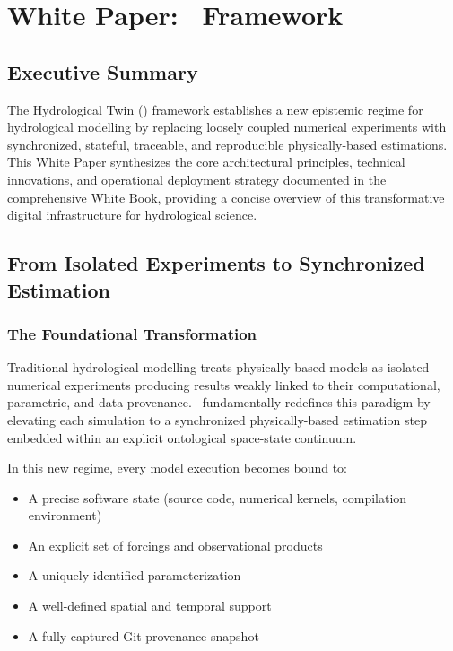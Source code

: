 \chapter*{White Paper: \hydrot\ Framework}
{}
\fancyhead[LE]{\thepage} 
\fancyhead[RO]{\thepage} 
\fancyfoot[C]{\thepage}

\renewcommand{\headrulewidth}{0.1pt}

\setlength{\parindent}{0cm}
\setlength{\parskip}{9pt}
\vspace{-1cm}

\htastarget



\section*{Executive Summary}

The Hydrological Twin (\hydrot) framework establishes a new epistemic regime for hydrological modelling by replacing loosely coupled numerical experiments with synchronized, stateful, traceable, and reproducible physically-based estimations. This White Paper synthesizes the core architectural principles, technical innovations, and operational deployment strategy documented in the comprehensive White Book, providing a concise overview of this transformative digital infrastructure for hydrological science.

\section{From Isolated Experiments to Synchronized Estimation}

\subsection{The Foundational Transformation}

Traditional hydrological modelling treats physically-based models as isolated numerical experiments producing results weakly linked to their computational, parametric, and data provenance. \hydrot\ fundamentally redefines this paradigm by elevating each simulation to a synchronized physically-based estimation step embedded within an explicit ontological space-state continuum.

In this new regime, every model execution becomes bound to:
\begin{itemize}
\item A precise software state (source code, numerical kernels, compilation environment)
\item An explicit set of forcings and observational products
\item A uniquely identified parameterization
\item A well-defined spatial and temporal support
\item A fully captured Git provenance snapshot
\end{itemize}

